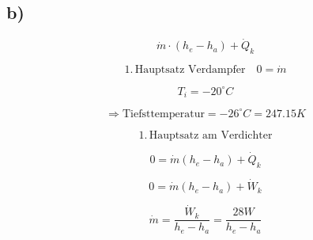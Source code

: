 

\subsection*{b)}

\[
\dot{m} \cdot (h_e - h_a) + \dot{Q}_k
\]

\[
1. \, \text{Hauptsatz Verdampfer} \quad 0 = \dot{m}
\]

\[
T_i = -20^\circ C
\]

\[
\Rightarrow \text{Tiefsttemperatur} = -26^\circ C = 247.15 K
\]

\[
1. \, \text{Hauptsatz am Verdichter}
\]

\[
0 = \dot{m} (h_e - h_a) + \dot{Q}_k
\]

\[
0 = \dot{m} (h_e - h_a) + \dot{W}_k
\]

\[
\dot{m} = \frac{\dot{W}_k}{h_e - h_a} = \frac{28 W}{h_e - h_a}
\]